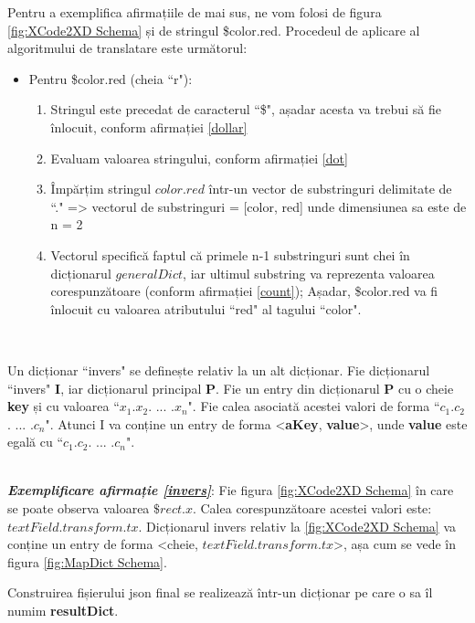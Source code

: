 Pentru a exemplifica afirmațiile de mai sus, ne vom folosi de figura \ref{fig:XCode2XD Schema} și de stringul \$color.red. Procedeul de aplicare al algoritmului de translatare este următorul:

\begin{itemize} \label{modalitate}
\item Pentru \$color.red (cheia ``r"): 
\begin{enumerate}
\item Stringul este precedat de caracterul ``\$", așadar acesta va trebui să fie înlocuit, conform afirmației \ref{dollar}
\item Evaluam valoarea stringului, conform afirmației \ref{dot}
\item Împărțim stringul $color.red$ într-un vector de substringuri delimitate de ``." => vectorul de substringuri = [color, red] unde dimensiunea sa este de n = 2
\item Vectorul specifică faptul că primele n-1 substringuri sunt chei în dicționarul $generalDict$, iar ultimul substring va reprezenta valoarea corespunzătoare (conform afirmației \ref{count}); Așadar, \$color.red va fi înlocuit cu valoarea atributului ``red" al tagului ``color".\\
\end{enumerate}
\end{itemize}

\\
\begin{mydef} \label{invers}
Un dicționar ``invers" se definește relativ la un alt dicționar. 
Fie dicționarul ``invers" \textbf{I}, iar dicționarul principal \textbf{P}. 
Fie un entry din dicționarul \textbf{P} cu o cheie \textbf{key} și cu valoarea ``$x_1$.$x_2$. ... .$x_n$".
Fie calea asociată acestei valori de forma ``$c_1$.$c_2$. ... .$c_n$".
Atunci I va conține un entry de forma <\textbf{aKey}, \textbf{value}>, unde \textbf{value} este egală cu ``$c_1$.$c_2$. ... .$c_n$".
\end{mydef}
\\
\textbf{\textit{Exemplificare afirmație \ref{invers}}}: Fie figura \ref{fig:XCode2XD Schema} în care se poate observa valoarea $\$rect.x$. Calea corespunzătoare acestei valori este: $textField.transform.tx$. Dicționarul invers relativ la \ref{fig:XCode2XD Schema} va conține un entry de forma <cheie, $textField.transform.tx$>, așa cum se vede în figura \ref{fig:MapDict Schema}. 
\\
\begin{myNote}
Construirea fișierului json final se realizează într-un dicționar pe care o sa îl numim \textbf{resultDict}.
\end{myNote}

